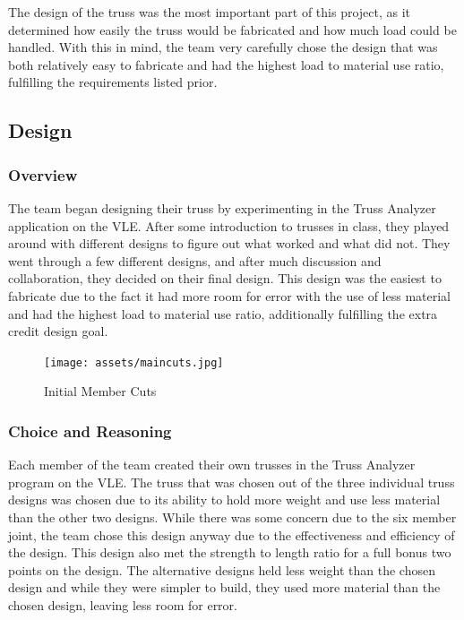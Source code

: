 \documentclass{article}
\let\Oldsubsection\subsection
\renewcommand{\subsection}{\FloatBarrier\Oldsubsection}
\let\Oldsubsubsection\subsubsection
\renewcommand{\subsubsection}{\FloatBarrier\Oldsubsubsection}
\begin{document}
The design of the truss was the most important part of this project, as it determined how easily the truss would be fabricated and how much load could be handled. With this in mind, the team very carefully chose the design that was both relatively easy to fabricate and had the highest load to material use ratio, fulfilling the requirements listed prior.

\subsection{Design}

\subsubsection{Overview}

The team began designing their truss by experimenting in the Truss Analyzer application on the VLE. After some introduction to trusses in class, they played around with different designs to figure out what worked and what did not. They went through a few different designs, and after much discussion and collaboration, they decided on their final design. This design was the easiest to fabricate due to the fact it had more room for error with the use of less material and had the highest load to material use ratio, additionally fulfilling the extra credit design goal.

\begin{figure}[!htb]
  \centering
  \texttt{[image: assets/maincuts.jpg]}
  \label{fig:main-cuts}
  \caption{Initial Member Cuts}
\end{figure}

\subsubsection{Choice and Reasoning}

Each member of the team created their own trusses in the Truss Analyzer program on the VLE. The truss that was chosen out of the three individual truss designs was chosen due to its ability to hold more weight and use less material than the other two designs. While there was some concern due to the six member joint, the team chose this design anyway due to the effectiveness and efficiency of the design. This design also met the strength to length ratio for a full bonus two points on the design. The alternative designs held less weight than the chosen design and while they were simpler to build, they used more material than the chosen design, leaving less room for error. 
\end{document}
